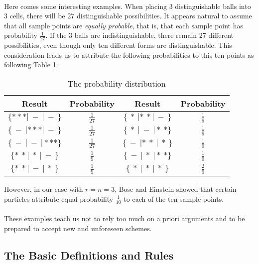 \documentclass{article}
\numberwithin{equation}{subsection}
\begin{document}
			\paragraph{} Here comes some interesting examples. When placing 3 distinguishable balls into 3 cells, there will be 27 distinguishable possibilities. It appears natural to assume that all sample points are \textit{equally probable}, that is, that each sample point has probability $\frac{1}{27}$. If the 3 balls are indistinguishable, there remain 27 different possibilities, even though only ten different forms are distinguishable. This consideration leads us to attribute the following probabilities to this ten points as following Table \ref{1.6:Table1}.
			\begin{table}
				\begin{center}
					\begin{tabular} {| c | c | c | c |}
						\hline
						Result & Probability & Result & Probability \\ \hline
						$\{***|\:-\:|\:-\:\}$ & $\frac{1}{27}$ & $\{\:*\:|*\:*|\:-\:\}$ & $\frac{1}{9}$ \\ \hline
						$\{\:-\:|***|\:-\:\}$ & $\frac{1}{27}$ & $\{\:*\:|\:-\:|*\:*\}$ & $\frac{1}{9}$ \\ \hline
						$\{\:-\:|\:-\:|***\}$ & $\frac{1}{27}$ & $\{\:-\:|*\:*\:|\:*\:\}$ & $\frac{1}{9}$ \\ \hline
						$\{*\:*|\:*\:|\:-\:\}$ & $\frac{1}{9}$ & $\{\:-\:|\:*\:|*\:*\}$ & $\frac{1}{9}$ \\ \hline
						$\{*\:*|\:-\:|\:*\:\}$ & $\frac{1}{9}$ & $\{\:*\:|\:*\:|\:*\:\}$ & $\frac{2}{9}$\\ \hline			
					\end{tabular}
					\caption{The probability distribution}
					\label{1.6:Table1}
				\end{center}
			\end{table}
			However, in our case with $r=n=3$, Bose and Einstein showed that certain particles attribute equal probability $\frac{1}{10}$ to each of the ten sample points.
			\paragraph{} These examples teach us not to rely too much on a priori arguments and to be prepared to accept new and unforeseen schemes.
		\subsection{The Basic Definitions and Rules}
\end{document}
